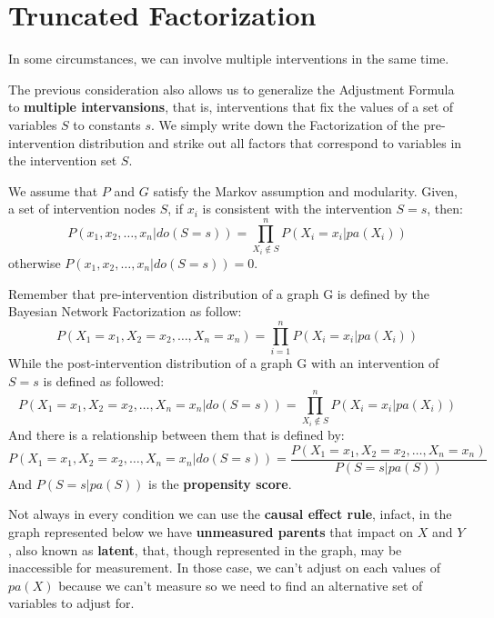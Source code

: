 \section{Truncated Factorization}
In some circumstances, we can involve multiple interventions in the same time.

The previous consideration also allows us to generalize the Adjustment Formula to
\textbf{multiple intervansions}, that is, interventions that fix the values of a
set of variables $S$ to constants $s$. We simply write down the Factorization of
the pre-intervention distribution and strike out all factors that correspond to
variables in the intervention set $S$.

\begin{definition}
      We assume that $P$ and $G$ satisfy the Markov assumption and modularity.
      Given, a set of intervention nodes $S$, if $x_i$ is consistent with the
      intervention $S = s$, then:
      \begin{equation}
            P(x_1, x_2, \dots, x_n| do(S = s)) = \prod_{X_i\not \in S}^{n} P(X_i = x_i | pa(X_i))
      \end{equation}
      otherwise $P(x_1, x_2, \dots, x_n| do(S = s)) = 0$.
\end{definition}

\begin{note}
      Remember that pre-intervention distribution of a graph G is defined by the 
      Bayesian Network Factorization as follow:
      $$P(X_1 = x_1, X_2=x_2, \dots, X_n=x_n) = \prod_{i=1}^{n} P(X_i=x_i | pa(X_i))$$
      While the post-intervention distribution of a graph G with an intervention of 
      $S=s$ is defined as followed:
      $$P(X_1 = x_1, X_2=x_2, \dots, X_n=x_n | do(S=s)) = \prod_{X_i\not \in S}^{n} P(X_i=x_i | pa(X_i))$$
      And there is a relationship between them that is defined by:
      $$P(X_1 = x_1, X_2=x_2, \dots, X_n=x_n | do(S=s)) = \frac{P(X_1 = x_1, X_2=x_2, \dots, X_n=x_n)}{P(S=s | pa(S))}$$
      And $P(S=s | pa(S))$ is the \textbf{propensity score}.
\end{note}

Not always in every condition we can use the \textbf{causal effect rule}, infact,
in the graph represented below we have \textbf{unmeasured parents} that impact on
$X$ and $Y$, also known as
\textbf{latent}, that, though represented in the graph, may be inaccessible for
measurement. In those case, we can't adjust on each values of $pa(X)$ because we 
can't measure so we need to find an alternative set of variables to adjust for.

